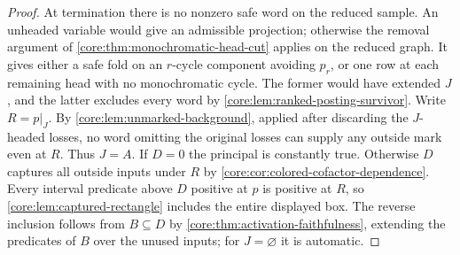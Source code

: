 \begin{proof}
At termination there is no nonzero safe word on the reduced sample.
An unheaded variable would give an admissible projection; otherwise
the removal argument of \cref{core:thm:monochromatic-head-cut}
applies on the reduced graph. It gives either a safe fold on an
$r$-cycle component avoiding $p_r$, or one row at each remaining
head with no monochromatic cycle. The former would have extended
$J$, and the latter excludes every word by \cref{core:lem:ranked-posting-survivor}.
Write $R=p|_J$. By \cref{core:lem:unmarked-background}, applied after
discarding the $J$-headed losses, no word omitting the original losses
can supply any outside mark even at $R$. Thus $J=A$. If $D=0$ the
principal is constantly true. Otherwise $D$ captures all outside inputs
under $R$ by \cref{core:cor:colored-cofactor-dependence}. Every interval
predicate above $D$ positive at $p$ is positive at $R$, so
\cref{core:lem:captured-rectangle} includes the entire displayed box.
The reverse inclusion follows from $B\subseteq D$ by
\cref{core:thm:activation-faithfulness}, extending the predicates of
$B$ over the unused inputs; for $J=\varnothing$ it is automatic.
\end{proof}


